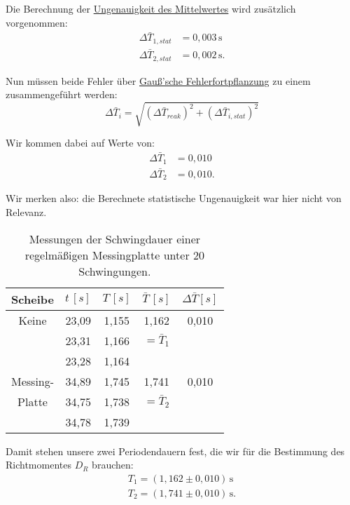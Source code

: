 Die Berechnung der \hyperref[eq:fehler_mittelwert]{Ungenauigkeit des Mittelwertes} wird zusätzlich vorgenommen:
\begin{align}
    \Delta \bar{T}_{1,stat} &= 0,003\,\mathrm{s} \\
    \Delta \bar{T}_{2,stat} &= 0,002\,\mathrm{s}.
\end{align}

Nun müssen beide Fehler über \hyperref[eq:gauss_fehlfortpflanzung]{Gauß'sche Fehlerfortpflanzung} zu einem zusammengeführt werden:
\begin{equation}
\Delta \bar{T}_{i} = \sqrt{(\Delta \bar{T}_{reak})^2 + (\Delta \bar{T}_{i,stat})^2}
\end{equation}

Wir kommen dabei auf Werte von:
\begin{align}
\Delta \bar{T}_1 &= 0,010 \\
\Delta \bar{T}_2 &= 0,010.
\end{align}

Wir merken also: die Berechnete statistische Ungenauigkeit war hier nicht von Relevanz.

\begin{table}[h!]
    \begin{tabular}{c | c | c | c | c}
    Scheibe & $t \, [s]$& $T \, [s]$ & $\bar{T} \, [s]$ & $\Delta \bar{T} [s]$\\
    \hline
    Keine       & 23,09 & 1,155 & 1,162 & 0,010\\
                & 23,31 & 1,166 & $= \bar{T}_1$ & \\
                & 23,28 & 1,164 &  & \\
     \hline
    Messing-    & 34,89 & 1,745 & 1,741 & 0,010\\
    Platte      & 34,75 & 1,738 & $= \bar{T}_2$ & \\
                & 34,78 & 1,739 &  & \\
    \hline
    \end{tabular}
    \caption{Messungen der Schwingdauer einer regelmäßigen Messingplatte unter 20 Schwingungen.}
    \label{tab:regelmäßige_messingplatte}
\end{table}

Damit stehen unsere zwei Periodendauern fest, die wir für die Bestimmung des Richtmomentes $D_R$ brauchen:
\begin{align}
T_1 = (1,162 \pm 0,010)\,\mathrm{s} \\
T_2 = (1,741 \pm 0,010)\,\mathrm{s}.
\end{align}

